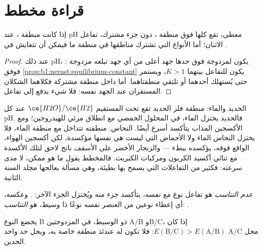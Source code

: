 \section{قراءة مخطط}\label{sec:b1:e-ph-diagrams:reading}

\begin{proposition}\label{prop:b1:e-ph-diagrams:disjoint-domains}
إذا كانت منطقة ، عند pH معطى، تقع كلها فوق منطقة
، دون جزء مشترك، تفاعل الاثنان؛ أما الأنواع التي
تشترك مناطقها في منطقة ما فيمكن أن تتعايش في .
\end{proposition}

\begin{proof}
عند ذلك pH، يكون لمزدوجة  فوق حدها جهد
أعلى من أي جهد تبلغه مزدوجة : فوفق
\cref{prop:b1:nernst:equilibrium-constant} يكون للتفاعل بينهما
$K > 1$، ويستمر حتى يُستهلك أحدهما أو تلتقي
منطقتاهما. أما داخل منطقة مشتركة فكلاهما الشكلان المستقران عند
الجهد نفسه: فلا شيء يدفع إلى تفاعل.
\end{proof}

الحديد والماء: منطقة فلز الحديد تقع تحت المستقيم
$\ce{H2O}/\ce{H2}$ عند كل pH. فالحديد يختزل الماء، في المحلول الحمضي
مع انطلاق مرئي للهيدروجين؛ ومع الأكسجين المذاب يتأكسد
أسرع أيضًا. النحاس: منطقته تتداخل مع منطقة الماء، فلا يختزل النحاس
الماء ولا الأحماض التي ليست هي نفسها مؤكسدة، لكن
أكسجين الهواء، الواقع فوقه، يؤكسده ببطء --- والزنجار الأخضر على الأسقف
ناتج لاحق لتلك الأكسدة مع ثنائي أكسيد الكربون ومركبات
الكبريت. فالمخطط يقول ما هو ممكن، لا مدى سرعته: فكثير من التفاعلات
التي يسمح بها بطيئة، وهي مسألة يعالجها مجلد السنة الثانية.

\begin{definition}\label{def:b1:e-ph-diagrams:disproportionation}
\emph{عدم التناسب} هو تفاعل
نوع مع نفسه، يتأكسد جزء منه ويُختزل الجزء الآخر:
. وعكسه، أي إعطاء نوعين من العنصر نفسه
نوعًا ذا  وسيط، هو
\emph{التناسب}:
.
\end{definition}

\begin{proposition}\label{prop:b1:e-ph-diagrams:disproportionation-criterion}
يخضع النوع B ذو  الوسيط، في المزدوجتين A/B
وB/C،  إذا كان $E(\mathrm{B}/\mathrm{C}) > E(\mathrm{A}/\mathrm{B})$:
فلا تكون له عندئذ منطقة خاصة به، ويحل حد واحد A/C محل
الحدين.
\end{proposition}

